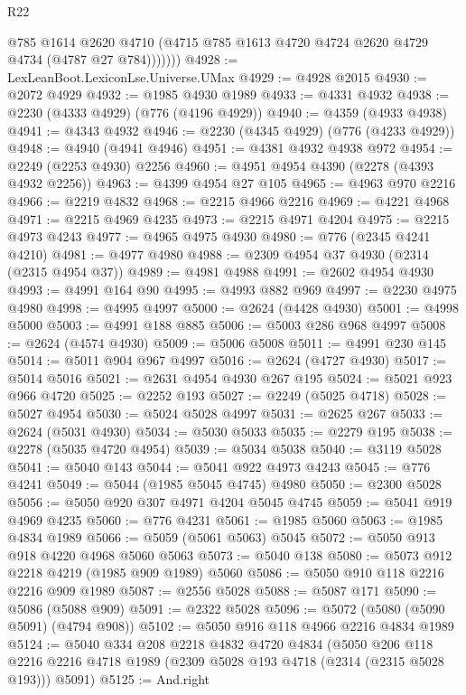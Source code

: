 \begin{lexlean}{R22}
\begin{coremodule}
              @785
              @1614
              @2620
              @4710
              (@4715 @785 @1613 @4720 @4724 @2620 @4729 @4734 (@4787 @27 @784)))))))
@4928 := LexLeanBoot.LexiconLse.Universe.UMax
@4929 := @4928 @2015
@4930 := @2072 @4929
@4932 := @1985 @4930 @1989
@4933 := @4331 @4932
@4938 := @2230 (@4333 @4929) (@776 (@4196 @4929))
@4940 := @4359 (@4933 @4938)
@4941 := @4343 @4932
@4946 := @2230 (@4345 @4929) (@776 (@4233 @4929))
@4948 := @4940 (@4941 @4946)
@4951 := @4381 @4932 @4938 @972
@4954 := @2249 (@2253 @4930) @2256
@4960 := @4951 @4954 @4390 (@2278 (@4393 @4932 @2256))
@4963 := @4399 @4954 @27 @105
@4965 := @4963 @970 @2216
@4966 := @2219 @4832
@4968 := @2215 @4966 @2216
@4969 := @4221 @4968
@4971 := @2215 @4969 @4235
@4973 := @2215 @4971 @4204
@4975 := @2215 @4973 @4243
@4977 := @4965 @4975 @4930
@4980 := @776 (@2345 @4241 @4210)
@4981 := @4977 @4980
@4988 := @2309 @4954 @37 @4930 (@2314 (@2315 @4954 @37))
@4989 := @4981 @4988
@4991 := @2602 @4954 @4930
@4993 := @4991 @164 @90
@4995 := @4993 @882 @969
@4997 := @2230 @4975 @4980
@4998 := @4995 @4997
@5000 := @2624 (@4428 @4930)
@5001 := @4998 @5000
@5003 := @4991 @188 @885
@5006 := @5003 @286 @968 @4997
@5008 := @2624 (@4574 @4930)
@5009 := @5006 @5008
@5011 := @4991 @230 @145
@5014 := @5011 @904 @967 @4997
@5016 := @2624 (@4727 @4930)
@5017 := @5014 @5016
@5021 := @2631 @4954 @4930 @267 @195
@5024 := @5021 @923 @966 @4720
@5025 := @2252 @193
@5027 := @2249 (@5025 @4718)
@5028 := @5027 @4954
@5030 := @5024 @5028 @4997
@5031 := @2625 @267
@5033 := @2624 (@5031 @4930)
@5034 := @5030 @5033
@5035 := @2279 @195
@5038 := @2278 (@5035 @4720 @4954)
@5039 := @5034 @5038
@5040 := @3119 @5028
@5041 := @5040 @143
@5044 := @5041 @922 @4973 @4243
@5045 := @776 @4241
@5049 := @5044 (@1985 @5045 @4745) @4980
@5050 := @2300 @5028
@5056 := @5050 @920 @307 @4971 @4204 @5045 @4745
@5059 := @5041 @919 @4969 @4235
@5060 := @776 @4231
@5061 := @1985 @5060
@5063 := @1985 @4834 @1989
@5066 := @5059 (@5061 @5063) @5045
@5072 := @5050 @913 @918 @4220 @4968 @5060 @5063
@5073 := @5040 @138
@5080 := @5073 @912 @2218 @4219 (@1985 @909 @1989) @5060
@5086 := @5050 @910 @118 @2216 @2216 @909 @1989
@5087 := @2556 @5028
@5088 := @5087 @171
@5090 := @5086 (@5088 @909)
@5091 := @2322 @5028
@5096 := @5072 (@5080 (@5090 @5091) (@4794 @908))
@5102 := @5050 @916 @118 @4966 @2216 @4834 @1989
@5124 := @5040
    @334
    @208
    @2218
    @4832
    @4720
    @4834
    (@5050
      @206
      @118
      @2216
      @2216
      @4718
      @1989
      (@2309 @5028 @193 @4718 (@2314 (@2315 @5028 @193)))
      @5091)
@5125 := And.right

\end{coremodule}
\end{lexlean}
